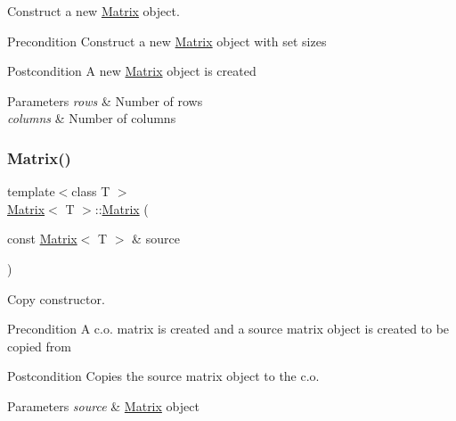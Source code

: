 Construct a new \mbox{\hyperlink{class_matrix}{Matrix}} object. 

\begin{DoxyPrecond}{Precondition}
Construct a new \mbox{\hyperlink{class_matrix}{Matrix}} object with set sizes 
\end{DoxyPrecond}
\begin{DoxyPostcond}{Postcondition}
A new \mbox{\hyperlink{class_matrix}{Matrix}} object is created 
\end{DoxyPostcond}

\begin{DoxyParams}{Parameters}
{\em rows} & Number of rows \\
\hline
{\em columns} & Number of columns \\
\hline
\end{DoxyParams}
\mbox{\label{class_matrix_abc1e84ee28720ecc8a6807bb3f09f43e}} 
\subsubsection{\texorpdfstring{Matrix()}{Matrix()}\hspace{0.1cm}{\footnotesize\ttfamily [3/3]}}
{\footnotesize\ttfamily template$<$class T $>$ \\
\mbox{\hyperlink{class_matrix}{Matrix}}$<$ T $>$\+::\mbox{\hyperlink{class_matrix}{Matrix}} (\begin{DoxyParamCaption}\item[{const \mbox{\hyperlink{class_matrix}{Matrix}}$<$ T $>$ \&}]{source }\end{DoxyParamCaption})}



Copy constructor. 

\begin{DoxyPrecond}{Precondition}
A c.\+o. matrix is created and a source matrix object is created to be copied from 
\end{DoxyPrecond}
\begin{DoxyPostcond}{Postcondition}
Copies the source matrix object to the c.\+o. 
\end{DoxyPostcond}

\begin{DoxyParams}{Parameters}
{\em source} & \mbox{\hyperlink{class_matrix}{Matrix}} object \\
\hline
\end{DoxyParams}
\mbox{\label{class_matrix_a91aa704de674203e96aece9e1955ccd3}} 
